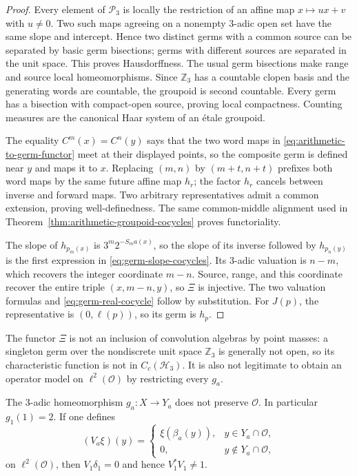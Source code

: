 \begin{proof}
Every element of $\mathcal P_3$ is locally the restriction of an affine map
$x\mapsto ux+v$ with $u\ne0$.  Two such maps agreeing on a nonempty
$3$-adic open set have the same slope and intercept.  Hence two distinct
germs with a common source can be separated by basic germ bisections; germs
with different sources are separated in the unit space.  This proves
Hausdorffness.  The usual germ bisections make range and source local
homeomorphisms.  Since $\mathbb Z_3$ has a countable clopen basis and the
generating words are countable, the groupoid is second countable.  Every
germ has a bisection with compact-open source, proving local compactness.
Counting measures are the canonical Haar system of an \'{e}tale groupoid.

The equality $C^m(x)=C^n(y)$ says that the two word maps in
\eqref{eq:arithmetic-to-germ-functor} meet at their displayed points, so the
composite germ is defined near $y$ and maps it to $x$.  Replacing $(m,n)$ by
$(m+t,n+t)$ prefixes both word maps by the same future affine map $h_r$;
the factor $h_r$ cancels between inverse and forward maps.  Two arbitrary
representatives admit a common extension, proving well-definedness.  The
same common-middle alignment used in
Theorem~\ref{thm:arithmetic-groupoid-cocycles} proves functoriality.

The slope of $h_{p_m(x)}$ is $3^m2^{-S_ma(x)}$, so the slope of its inverse
followed by $h_{p_n(y)}$ is the first expression in
\eqref{eq:germ-slope-cocycles}.  Its $3$-adic valuation is $n-m$, which
recovers the integer coordinate $m-n$.  Source, range, and this coordinate
recover the entire triple $(x,m-n,y)$, so $\Xi$ is injective.  The two
valuation formulas and \eqref{eq:germ-real-cocycle} follow by substitution.
For $J(p)$, the representative is $(0,\ell(p))$, so its germ is $h_p$.
\end{proof}

The functor $\Xi$ is not an inclusion of convolution algebras by point
masses: a singleton germ over the nondiscrete unit space $\mathbb Z_3$ is
generally not open, so its characteristic function is not in
$C_c(\mathcal H_3)$.  It is also not legitimate to obtain an operator model
on $\ell^2(\mathcal O)$ by restricting every $g_a$.

\begin{proposition}
\label{prop:three-adic-l2-restriction-failure}
The $3$-adic homeomorphism $g_a:X\to Y_a$ does not preserve
$\mathcal O$.  In particular $g_1(1)=2$.  If one defines
\[
 (V_a\xi)(y)=
 \begin{cases}
  \xi(\beta_a(y)),&y\in Y_a\cap\mathcal O,\\
  0,&y\notin Y_a\cap\mathcal O,
 \end{cases}
\]
on $\ell^2(\mathcal O)$, then $V_1\delta_1=0$ and hence
$V_1^*V_1\ne1$.
\end{proposition}

